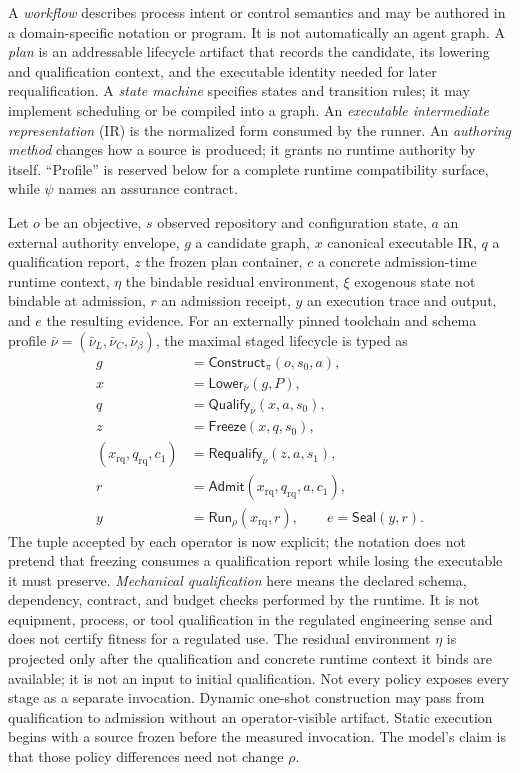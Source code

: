 \documentclass[11pt]{article}
\begin{document}
A \emph{workflow} describes process intent or control semantics and may be
authored in a domain-specific notation or program.  It is not automatically an
agent graph.  A \emph{plan} is an addressable lifecycle artifact that records
the candidate, its lowering and qualification context, and the executable
identity needed for later requalification.  A \emph{state machine} specifies
states and transition rules; it may implement scheduling or be compiled into a
graph.  An \emph{executable intermediate representation} (IR) is the normalized
form consumed by the runner.  An \emph{authoring method} changes how a source
is produced; it grants no runtime authority by itself. ``Profile'' is reserved
below for a complete runtime compatibility surface, while \(\psi\) names an
assurance contract.

Let \(o\) be an objective, \(s\) observed repository and configuration state,
\(a\) an external authority envelope, \(g\) a candidate graph, \(x\) canonical
executable IR, \(q\) a qualification report, \(z\) the frozen plan container,
\(c\) a concrete admission-time runtime context, \(\eta\) the bindable
residual environment, \(\xi\) exogenous state not bindable at admission,
\(r\) an admission receipt, \(y\) an execution trace and output, and \(e\)
the resulting evidence. For an externally pinned toolchain and schema profile
\(\bar\nu=(\bar\nu_L,\bar\nu_C,\bar\nu_\beta)\), the maximal staged lifecycle
is typed as
\[
\begin{aligned}
g&=\mathsf{Construct}_{\pi}(o,s_0,a),\\
x&=\mathsf{Lower}_{\bar\nu}(g,P),\\
q&=\mathsf{Qualify}_{\bar\nu}(x,a,s_0),\\
z&=\mathsf{Freeze}(x,q,s_0),\\
(x_{\mathrm{rq}},q_{\mathrm{rq}},c_1)
  &=\mathsf{Requalify}_{\bar\nu}(z,a,s_1),\\
r&=\mathsf{Admit}(x_{\mathrm{rq}},q_{\mathrm{rq}},a,c_1),\\
y&=\mathsf{Run}_{\rho}(x_{\mathrm{rq}},r),\qquad
e=\mathsf{Seal}(y,r).
\end{aligned}
\]
The tuple accepted by each operator is now explicit; the notation does not
pretend that freezing consumes a qualification report while losing the
executable it must preserve. \emph{Mechanical qualification} here means the
declared schema, dependency, contract, and budget checks performed by the
runtime. It is not equipment, process, or tool qualification in the regulated
engineering sense and does not certify fitness for a regulated use. The residual environment
\(\eta\) is projected only after the qualification and concrete runtime
context it binds are available; it is not an input to initial qualification.
Not every policy exposes every
stage as a separate invocation.  Dynamic one-shot construction may pass from
qualification to admission without an operator-visible artifact.  Static
execution begins with a source frozen before the measured invocation.  The
model's claim is that those policy differences need not change
\(\rho\).
\end{document}
